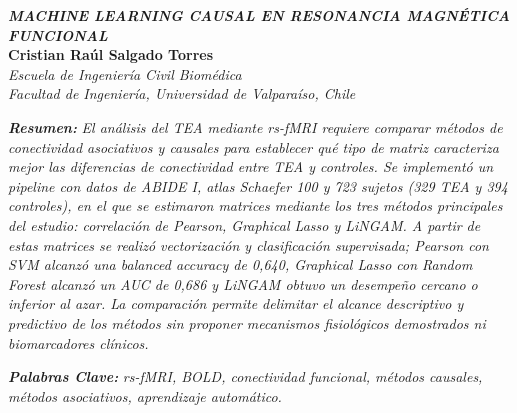 \documentclass[12pt,letterpaper]{article}
\newcommand{\TituloTrabajo}{\textit{MACHINE LEARNING CAUSAL EN RESONANCIA MAGNÉTICA FUNCIONAL}}
\newcommand{\AutorNombre}{Cristian Raúl Salgado Torres}
\begin{document}
\newpage

\thispagestyle{sinCabecera}
\tableofcontents
\newpage

\rmfamily
\fontsize{9}{11}\selectfont
\setlength{\parskip}{5pt}

\begin{center}
  {\rmfamily\fontsize{11}{13}\bfseries\TituloTrabajo}\\[0.5cm]
  {\rmfamily\fontsize{9}{11}\bfseries\AutorNombre}\\[0.15cm]
  {\rmfamily\fontsize{9}{11}\itshape Escuela de Ingeniería Civil Biomédica}\\
  {\rmfamily\fontsize{9}{11}\itshape Facultad de Ingeniería, Universidad de Valparaíso, Chile}
\end{center}

\vspace{0.5cm}

\noindent\textbf{\textit{Resumen: }}
{\itshape
El análisis del TEA mediante rs-fMRI requiere comparar métodos de conectividad asociativos y causales para establecer qué tipo de matriz caracteriza mejor las diferencias de conectividad entre TEA y controles.
Se implementó un pipeline con datos de ABIDE I, atlas Schaefer 100 y 723 sujetos (329 TEA y 394 controles), en el que se estimaron matrices mediante los tres métodos principales del estudio: correlación de Pearson, Graphical Lasso y LiNGAM.
A partir de estas matrices se realizó vectorización y clasificación supervisada; Pearson con SVM alcanzó una \textit{balanced accuracy} de 0{,}640, Graphical Lasso con Random Forest alcanzó un AUC de 0{,}686 y LiNGAM obtuvo un desempeño cercano o inferior al azar.
La comparación permite delimitar el alcance descriptivo y predictivo de los métodos sin proponer mecanismos fisiológicos demostrados ni biomarcadores clínicos.
}

\vspace{0.4cm}
\noindent\textbf{\textit{Palabras Clave:}}
\textit{rs-fMRI, BOLD, conectividad funcional, métodos causales, métodos asociativos, aprendizaje automático.}
\end{document}
